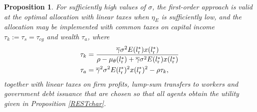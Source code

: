 \documentclass[11pt]{article}
\theoremstyle{plain}
\newtheorem{prop}[thm]{Proposition}
\begin{document}

\begin{prop}\label{linTAX}
For sufficiently high values of $\sigma$, the first-order approach is valid at the optimal allocation with linear taxes when $\eta_E$ is sufficiently low, and the allocation may be implemented with common taxes on capital income $\tau_k := \tau_s = \tau_{cg}$ and wealth $\tau_a$, where 
\begin{align*}
\tau_k & = \frac{\overline{\gamma}\sigma^2E(l_{\textnormal{r}}^*)x(l_{\textnormal{r}}^*)}{\rho - \mu_{\theta}(l_{\textnormal{r}}^*) + \overline{\gamma}\sigma^2E(l_{\textnormal{r}}^*)x(l_{\textnormal{r}}^*)}
\\ \tau_a & = \overline{\gamma}^2\sigma^2E(l_{\textnormal{r}}^*)^2x(l_{\textnormal{r}}^*)^2 - \rho \tau_k,
\end{align*}
together with linear taxes on firm profits, lump-sum transfers to workers and government debt issuance that are chosen so that all agents obtain the utility given in Proposition \ref{RESTchar}. 
\end{prop} 
\end{document}
